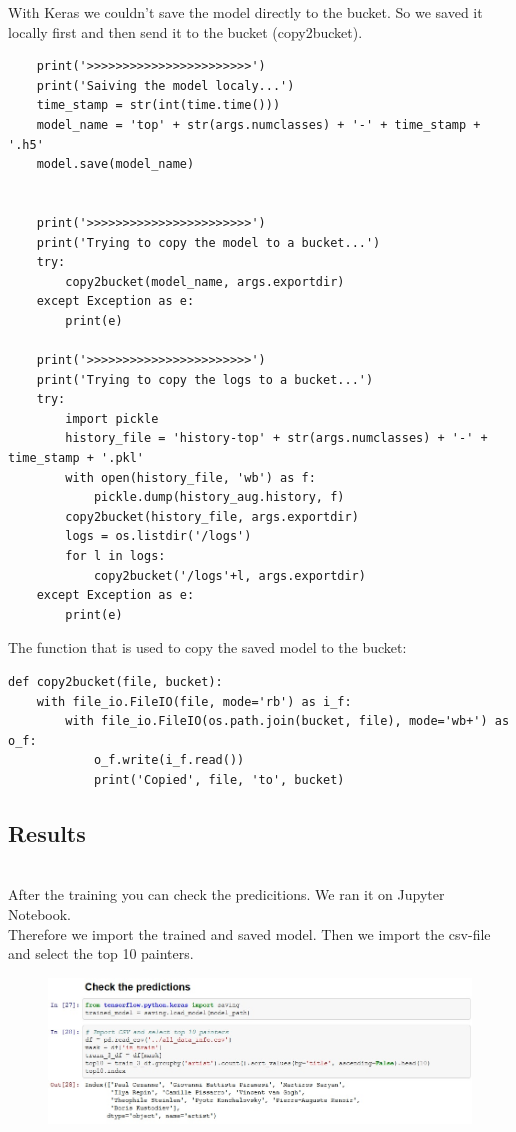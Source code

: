 \documentclass[
	12pt, %
]{fphw}
\begin{document}
\noindent With Keras we couldn't save the model directly to the bucket. So we saved it locally first and then send it to the bucket (copy2bucket). 
\begin{lstlisting}
    print('>>>>>>>>>>>>>>>>>>>>>>>')
    print('Saiving the model localy...')
    time_stamp = str(int(time.time()))
    model_name = 'top' + str(args.numclasses) + '-' + time_stamp + '.h5'
    model.save(model_name)
    

    print('>>>>>>>>>>>>>>>>>>>>>>>')
    print('Trying to copy the model to a bucket...')
    try:
        copy2bucket(model_name, args.exportdir)
    except Exception as e: 
        print(e)
    
    print('>>>>>>>>>>>>>>>>>>>>>>>')
    print('Trying to copy the logs to a bucket...')
    try:
        import pickle
        history_file = 'history-top' + str(args.numclasses) + '-' + time_stamp + '.pkl'
        with open(history_file, 'wb') as f:
            pickle.dump(history_aug.history, f)
        copy2bucket(history_file, args.exportdir)
        logs = os.listdir('/logs')
        for l in logs:
            copy2bucket('/logs'+l, args.exportdir)
    except Exception as e: 
        print(e)
\end{lstlisting}

\noindent The function that is used to copy  the saved model to the bucket:
\begin{lstlisting}
def copy2bucket(file, bucket):
    with file_io.FileIO(file, mode='rb') as i_f:
        with file_io.FileIO(os.path.join(bucket, file), mode='wb+') as o_f:
            o_f.write(i_f.read())
            print('Copied', file, 'to', bucket)
\end{lstlisting}

\subsection*{Results}
\ \\ 

\noindent After the training you can check the predicitions. We ran it on Jupyter Notebook. \\
Therefore we import the trained and saved model. Then we import the csv-file and select the top 10 painters.\\
\begin{figure}[H]
	\includegraphics[width=1\textwidth]{Check1.jpg}
\end{figure}
\end{document}
